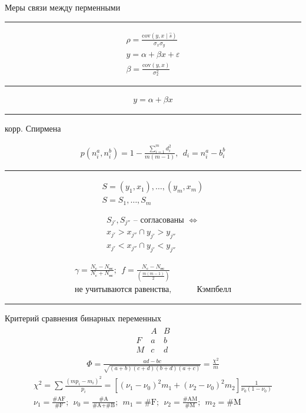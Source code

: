 \documentclass{book}
\begin{document}
Меры связи между перменными
\hrule

\begin{gather*}
\rho=\frac{\mathrm{cov}(y,x\mid \hat{s})}{\sigma_x \sigma_y}\\
y=\alpha+\beta x+\varepsilon\\
\beta=\frac{\mathrm{cov}(y,x)}{\sigma_x^2}
\end{gather*}

\hrule

 \begin{gather*}
  y=\alpha+\beta x
\end{gather*}
\hrule

корр. Спирмена

\begin{gather*}
  p(n_i^a, n_i^b)=1-\frac{\sum_{i=1}^{m} {d_i^2}}{m(m-1)},~~d_i=n_i^a-b_i^{b}
\end{gather*}

\hrule
\begin{gather*}
    S={(y_1,x_1),\dots,(y_m,x_m)}\\
    S={S_1,\dots,S_m}
\end{gather*}

\begin{gather*}
    S_{j'}, S_{j''} \textrm{ -- согласованы } \Leftrightarrow\\
    x_{j'}>x_{j''} \cap y_{j'}>y_{j''}\\
    x_{j'}<x_{j''} \cap y_{j'}<y_{j''}
\end{gather*}

\begin{gather*}
  \gamma = \frac{N_\textrm{с}-N_\textrm{нс}}{N_\textrm{с}+N_\textrm{нс}};~~
  f=\frac{N_\textrm{с}-N_\textrm{нс}}{\left(\frac{m(m-1)}{2}\right)}\\
  \textrm{не учитываются равенства}, ~~~~~~~~~~~~~~\textrm{Кэмпбелл}
\end{gather*}
\hrule

Критерий сравнения бинарных переменных
\begin{gather*}
  \begin{matrix}
      &A&B\\
      F&a&b\\
      M&c&d
  \end{matrix}
\end{gather*}
\begin{gather*}
  \Phi = \frac{ad-bc}{\sqrt{(a+b)(c+d)(b+d)(a+c)}}=\frac{\chi^2}{m}
\end{gather*}
\begin{gather*}
    \chi^2=\sum_{}^{} {\frac{(mp_i-m_i)^2}{p_i}}
    =[(\nu_1-\nu_0)^2m_1+(\nu_2-\nu_0)^2m_2]\frac{1}{\nu_0(1-\nu_0)}\\
    \nu_1=\frac{\textrm{\#AF}}{\textrm{\#F}};~~
    \nu_0=\frac{\textrm{\#A}}{\textrm{\#A}+\textrm{\#B}};~~
    m_1=\textrm{\#F};~~
    \nu_2=\frac{\textrm{\#AM}}{\textrm{\#M}};~~
    m_2=\textrm{\#M}
\end{gather*}
\end{document}
